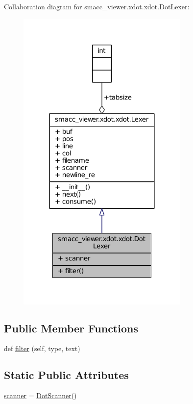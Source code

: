 Collaboration diagram for smacc\+\_\+viewer.\+xdot.\+xdot.\+Dot\+Lexer\+:
\nopagebreak
\begin{figure}[H]
\begin{center}
\leavevmode
\includegraphics[width=240pt]{classsmacc__viewer_1_1xdot_1_1xdot_1_1DotLexer__coll__graph}
\end{center}
\end{figure}
\subsection*{Public Member Functions}
\begin{DoxyCompactItemize}
\item 
def \hyperlink{classsmacc__viewer_1_1xdot_1_1xdot_1_1DotLexer_a1e1a54b0e7f85ff4206024322acbf5f5}{filter} (self, type, text)
\end{DoxyCompactItemize}
\subsection*{Static Public Attributes}
\begin{DoxyCompactItemize}
\item 
\hyperlink{classsmacc__viewer_1_1xdot_1_1xdot_1_1DotLexer_a48e3b43320865076a9a2924d217d8c23}{scanner} = \hyperlink{classsmacc__viewer_1_1xdot_1_1xdot_1_1DotScanner}{Dot\+Scanner}()
\end{DoxyCompactItemize}
